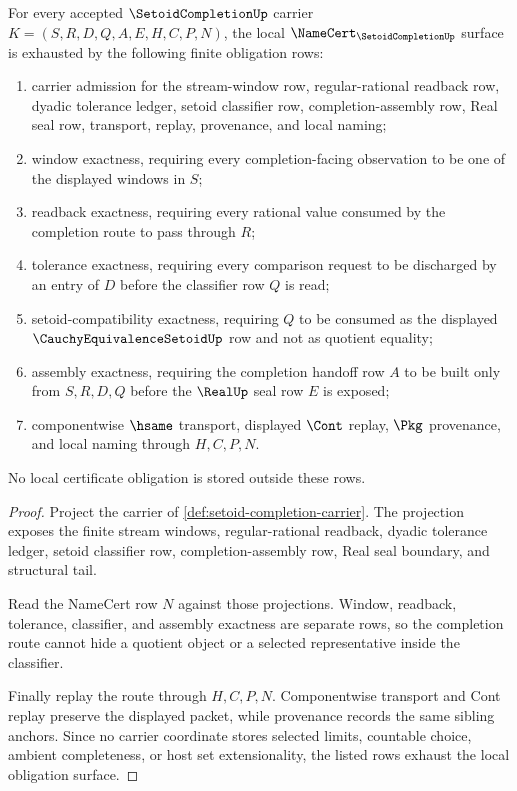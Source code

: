 \begin{theorem}
\label{thm:setoid-completion-namecert-obligations}
For every accepted $\SetoidCompletionUp$ carrier $K=(S,R,D,Q,A,E,H,C,P,N)$, the local $\NameCert_{\SetoidCompletionUp}$ surface is exhausted by the following finite obligation rows:
\begin{enumerate}
\item carrier admission for the stream-window row, regular-rational readback row, dyadic tolerance ledger, setoid classifier row, completion-assembly row, Real seal row, transport, replay, provenance, and local naming;
\item window exactness, requiring every completion-facing observation to be one of the displayed windows in $S$;
\item readback exactness, requiring every rational value consumed by the completion route to pass through $R$;
\item tolerance exactness, requiring every comparison request to be discharged by an entry of $D$ before the classifier row $Q$ is read;
\item setoid-compatibility exactness, requiring $Q$ to be consumed as the displayed $\CauchyEquivalenceSetoidUp$ row and not as quotient equality;
\item assembly exactness, requiring the completion handoff row $A$ to be built only from $S,R,D,Q$ before the $\RealUp$ seal row $E$ is exposed;
\item componentwise $\hsame$ transport, displayed $\Cont$ replay, $\Pkg$ provenance, and local naming through $H,C,P,N$.
\end{enumerate}
No local certificate obligation is stored outside these rows.
\end{theorem}
\begin{proof}
Project the carrier of \autoref{def:setoid-completion-carrier}. The projection exposes the finite stream windows, regular-rational readback, dyadic tolerance ledger, setoid classifier row, completion-assembly row, Real seal boundary, and structural tail.

Read the NameCert row $N$ against those projections. Window, readback, tolerance, classifier, and assembly exactness are separate rows, so the completion route cannot hide a quotient object or a selected representative inside the classifier.

Finally replay the route through $H,C,P,N$. Componentwise transport and Cont replay preserve the displayed packet, while provenance records the same sibling anchors. Since no carrier coordinate stores selected limits, countable choice, ambient completeness, or host set extensionality, the listed rows exhaust the local obligation surface.
\end{proof}

